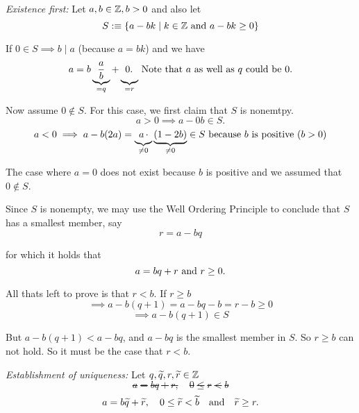\begin{prf}
  \emph{Existence first:} Let $a,b \in \mathbb{Z}, b > 0$ and also let
  \begin{equation}
    S :\equiv \{ a- bk \mid k \in \integer $ and $ a-bk \geq 0 \}
  \end{equation}

  If $0 \in S \implies b \mid a $ (because $a=bk$) and we have
  \begin{equation}
    a = b \underbrace{\frac{a}{b}}_{= q} + \underbrace{0.\phantom{\frac{a}{b}\!\!\!\!}}_{= r}
    $ Note that $a$ as well as $q$ could be $0.
  \end{equation}

  Now assume $0 \notin S$. For this case, we first claim that $S$ is nonemtpy.
  \begin{equation}
    a>0 \implies a-0b \in S.
  \end{equation}
  \begin{equation}
    a<0 \implies a-b(2a) = \underbrace{\!\!\phantom{(}a\,\cdot}_{\neq 0} \underbrace{(1-2b)}_{\neq 0} \in S $ because $b$ is positive $ (b>0)
  \end{equation}

  The case where $a=0$ does not exist because $b$ is positive and we assumed that $0 \notin S$.

  Since $S$ is nonempty, we may use the Well Ordering Principle to conclude that $S$ has a smallest member, say
  \begin{equation}
    r = a -bq
  \end{equation}

  for which it holds that
  \begin{equation}
    a=bq+r $ and $ r \geq 0.
  \end{equation}

  All thats left to prove is that $r  < b$. If $r \geq b$
  \begin{equation}
    \implies a-b(q+1) = a-bq -b = r-b \geq 0
  \end{equation}
  \begin{equation}
    \implies a-b(q+1) \in S
  \end{equation}

  But $a-b(q+1) < a-bq$, and $a-bq$ is the smallest member in $S$. So $r \geq b$ can not hold. So it must be the case that $r < b.$

  \bigbreak

  \emph{Establishment of uniqueness:} Let $q, \widetilde q,r,\widetilde r \in \mathbb{Z}$ \st
  \begin{equation}
    a = bq+r, \quad 0 \leq r < b
  \end{equation}
  \begin{equation}
    a = b \widetilde q + \widetilde r, \quad 0 \leq \widetilde r < \widetilde b \quad $and$ \quad \widetilde r \geq r.
  \end{equation}


\end{prf}
